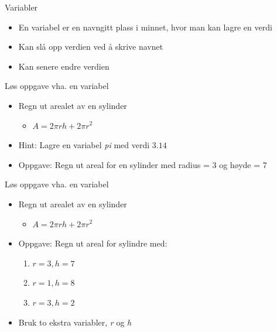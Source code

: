 \documentclass[screen, aspectratio=169]{beamer}
\begin{document}
\begin{frame}{Variabler}
	\begin{itemize}
		\item En variabel er en navngitt plass i minnet, hvor man kan lagre en verdi
		\item Kan slå opp verdien ved å skrive navnet
		\item Kan senere endre verdien
	\end{itemize}
\end{frame}

\begin{frame}{Løs oppgave vha. en variabel}
	\begin{itemize}
		\item Regn ut arealet av en sylinder
		\begin{itemize}
			\item $A=2\pi rh + 2\pi r^2$
		\end{itemize}
		\item Hint: Lagre en variabel \emph{pi} med verdi $3.14$
		\item Oppgave: Regn ut areal for en sylinder med radius = 3 og høyde = 7
	\end{itemize}
\end{frame}

\begin{frame}{Løs oppgave vha. en variabel}
	\begin{itemize}
		\item Regn ut arealet av en sylinder
		\begin{itemize}
			\item $A=2\pi rh + 2\pi r^2$
		\end{itemize}
		\item Oppgave: Regn ut areal for sylindre med:
		\begin{enumerate}
			\item $r=3, h=7$
			\item $r=1, h=8$
			\item $r=3, h=2$
		\end{enumerate}
		\item Bruk to ekstra variabler, \emph{r} og \emph{h}
	\end{itemize}
\end{frame}
\end{document}
